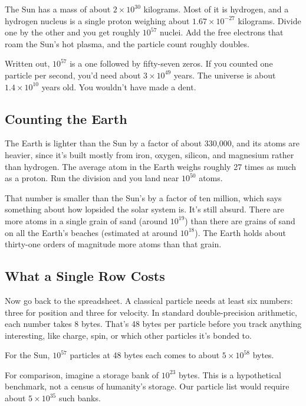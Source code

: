 The Sun has a mass of about \(2 \times 10^{30}\) kilograms. Most of it is hydrogen, and a hydrogen nucleus is a single proton weighing about \(1.67 \times 10^{-27}\) kilograms. Divide one by the other and you get roughly \(10^{57}\) nuclei. Add the free electrons that roam the Sun's hot plasma, and the particle count roughly doubles.

Written out, \(10^{57}\) is a one followed by fifty-seven zeros. If you counted one particle per second, you'd need about \(3 \times 10^{49}\) years. The universe is about \(1.4 \times 10^{10}\) years old. You wouldn't have made a dent.

\subsection{Counting the Earth}

The Earth is lighter than the Sun by a factor of about 330,000, and its atoms are heavier, since it's built mostly from iron, oxygen, silicon, and magnesium rather than hydrogen. The average atom in the Earth weighs roughly 27 times as much as a proton. Run the division and you land near \(10^{50}\) atoms.

That number is smaller than the Sun's by a factor of ten million, which says something about how lopsided the solar system is. It's still absurd. There are more atoms in a single grain of sand (around \(10^{19}\)) than there are grains of sand on all the Earth's beaches (estimated at around \(10^{18}\)). The Earth holds about thirty-one orders of magnitude more atoms than that grain.

\subsection{What a Single Row Costs}

Now go back to the spreadsheet. A classical particle needs at least six numbers: three for position and three for velocity. In standard double-precision arithmetic, each number takes 8 bytes. That's 48 bytes per particle before you track anything interesting, like charge, spin, or which other particles it's bonded to.

For the Sun, \(10^{57}\) particles at 48 bytes each comes to about \(5 \times 10^{58}\) bytes.

For comparison, imagine a storage bank of \(10^{23}\) bytes. This is a hypothetical benchmark, not a census of humanity's storage. Our particle list would require about \(5 \times 10^{35}\) such banks.

